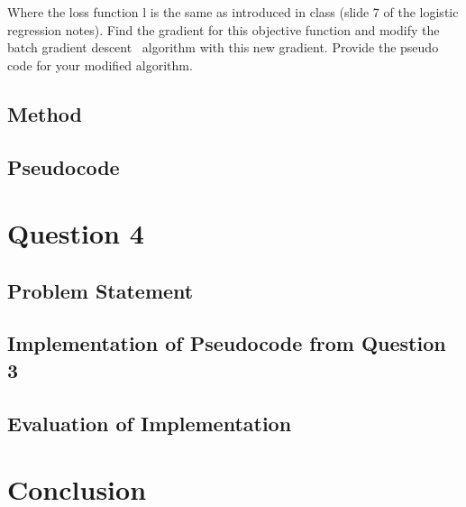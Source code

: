 \documentclass[letterpaper,10pt]{article}
\begin{document}
Where the loss function l is the same as introduced in class (slide 7 of the logistic regression 
notes). Find the gradient for this objective function and modify the batch gradient descent \
algorithm with this new gradient. Provide the pseudo code for your modified algorithm.

\subsection{Method}
\subsection{Pseudocode}

\section{Question 4}
\subsection{Problem Statement}

\subsection{Implementation of Pseudocode from Question 3}
\subsection{Evaluation of Implementation}

\section{Conclusion}
\end{document}
